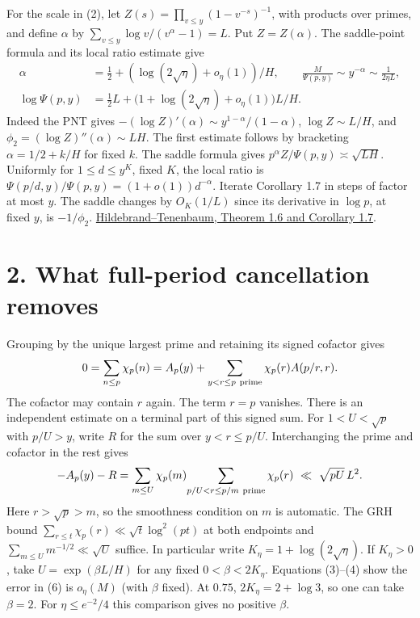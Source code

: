 \documentclass[11pt]{article}
\newcommand{\ch}{\chi_p}
\newcommand{\HT}{\href{https://jtnb.centre-mersenne.org/item/10.5802/jtnb.101.pdf}{Hildebrand--Tenenbaum, Theorem 1.6 and Corollary 1.7}}
\begin{document}
For the scale in (2), let \(Z(s)=\prod_{v\le y}(1-v^{-s})^{-1}\), with
products over primes, and define \(\alpha\) by
\(\sum_{v\le y}\log v/(v^\alpha-1)=L\). Put \(Z=Z(\alpha)\).
The saddle-point formula and its local ratio estimate give
\begin{align}
 \alpha&=\tfrac12+(\log(2\sqrt\eta)+o_\eta(1))/H,\qquad
 \frac{M}{\Psi(p,y)}\sim y^{-\alpha}\sim\frac{1}{2\eta L},\label{eq:ratio}\\
 \log\Psi(p,y)&=\tfrac12 L+
    \big(1+\log(2\sqrt\eta)+o_\eta(1)\big)L/H .\label{eq:psi}
\end{align}
Indeed the PNT gives \(-(\log Z)'(\alpha)\sim y^{1-\alpha}/(1-\alpha)\),
\(\log Z\sim L/H\), and \(\phi_2=(\log Z)''(\alpha)\sim LH\). The first
estimate follows by bracketing \(\alpha=1/2+k/H\) for fixed \(k\).
The saddle formula gives \(p^\alpha Z/\Psi(p,y)\asymp\sqrt{LH}\).
Uniformly for \(1\le d\le y^K\), fixed \(K\), the local ratio is
\(\Psi(p/d,y)/\Psi(p,y)=(1+o(1))d^{-\alpha}\). Iterate Corollary 1.7
in steps of factor at most \(y\). The saddle changes by \(O_K(1/L)\)
since its derivative in \(\log p\), at fixed \(y\), is \(-1/\phi_2\).
\HT.

\newpage
\section*{2. What full-period cancellation removes}
Grouping by the unique largest prime and retaining its signed cofactor gives
\begin{equation}
 0=\sum_{n\le p}\ch(n)=A_p(y)+
       \sum_{y<r\le p\ {\rm prime}}\ch(r)A(p/r,r).
 \label{eq:buchstab}
\end{equation}
The cofactor may contain \(r\) again. The term \(r=p\) vanishes. There
is an independent estimate on a terminal part of this signed sum. For
\(1<U<\sqrt p\) with \(p/U>y\), write \(R\) for the sum over
\(y<r\le p/U\). Interchanging the prime and cofactor in the rest gives
\begin{equation}
 -A_p(y)-R=\sum_{m\le U}\ch(m)\!
     \sum_{p/U<r\le p/m\ {\rm prime}}\ch(r)
       \ \ll\ \sqrt{pU}\,L^2 .
 \label{eq:tail}
\end{equation}
Here \(r>\sqrt p>m\), so the smoothness condition on \(m\) is automatic.
The GRH bound \(\sum_{r\le t}\ch(r)\ll\sqrt t\log^2(pt)\) at both
endpoints and \(\sum_{m\le U}m^{-1/2}\ll\sqrt U\) suffice. In particular
write \(K_\eta=1+\log(2\sqrt\eta)\). If \(K_\eta>0\), take
\(U=\exp(\beta L/H)\) for any fixed \(0<\beta<2K_\eta\).
Equations (3)--(4) show the error in (6) is \(o_\eta(M)\) (with \(\beta\)
fixed). At \(0.75\), \(2K_\eta=2+\log3\), so one can take \(\beta=2\).
For \(\eta\le e^{-2}/4\) this comparison gives no positive \(\beta\).
\end{document}
